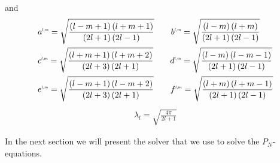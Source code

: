 and
\begin{align*}
&
a^{\scaleto{l,m}{4pt}}= \sqrt{\frac{\left(l-m+1\right)\left(l+m+1\right)}{\left(2l+1\right)\left(2l-1\right)}} \qquad
b^{\scaleto{l,m}{4pt}}= \sqrt{\frac{\left(l-m\right)\left(l+m\right)}{\left(2l+1\right)\left(2l-1\right)}}
\\&
c^{\scaleto{l,m}{4pt}}= \sqrt{\frac{\left(l+m+1\right)\left(l+m+2\right)}{\left(2l+3\right)\left(2l+1\right)}} \qquad
d^{\scaleto{l,m}{4pt}}= \sqrt{\frac{\left(l-m\right)\left(l-m-1\right)}{\left(2l+1\right)\left(2l-1\right)}}
\\&
e^{\scaleto{l,m}{4pt}}= \sqrt{\frac{\left(l-m+1\right)\left(l-m+2\right)}{\left(2l+3\right)\left(2l+1\right)}} \qquad
f^{\scaleto{l,m}{4pt}}= \sqrt{\frac{\left(l+m\right)\left(l+m-1\right)}{\left(2l+1\right)\left(2l-1\right)}}
\end{align*}
\begin{align*}
\lambda_l=\sqrt{\frac{4\pi}{2l+1}}
\end{align*}

In the next section we will present the solver that we use to solve the $P_N$-equations.
\vspace{1in}